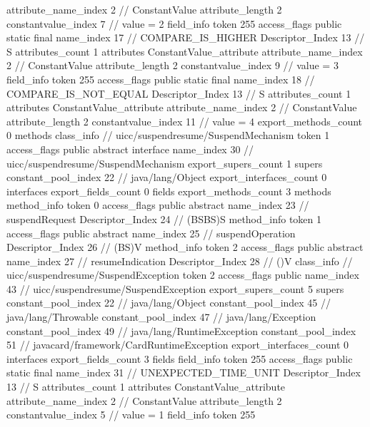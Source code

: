 {{{{{{{					attribute_name_index	2		// ConstantValue
					attribute_length	2
					constantvalue_index	7		// value = 2
				}
				}
			}
			field_info {
				token	255
				access_flags	public static final
				name_index	17		// COMPARE_IS_HIGHER
				Descriptor_Index	13		// S
				attributes_count	1
				attributes {
				ConstantValue_attribute {
					attribute_name_index	2		// ConstantValue
					attribute_length	2
					constantvalue_index	9		// value = 3
				}
				}
			}
			field_info {
				token	255
				access_flags	public static final
				name_index	18		// COMPARE_IS_NOT_EQUAL
				Descriptor_Index	13		// S
				attributes_count	1
				attributes {
				ConstantValue_attribute {
					attribute_name_index	2		// ConstantValue
					attribute_length	2
					constantvalue_index	11		// value = 4
				}
				}
			}
			}
			export_methods_count	0
			methods {
			}
		}
		class_info {		// uicc/suspendresume/SuspendMechanism
			token	1
			access_flags	public abstract interface
			name_index	30		// uicc/suspendresume/SuspendMechanism
			export_supers_count	1
			supers {
				constant_pool_index	22		// java/lang/Object
			}
			export_interfaces_count	0
			interfaces {
			}
			export_fields_count	0
			fields {
			}
			export_methods_count	3
			methods {
				method_info {
					token	0
					access_flags	public abstract
					name_index	23		// suspendRequest
					Descriptor_Index	24		// (BSBS)S
				}
				method_info {
					token	1
					access_flags	public abstract
					name_index	25		// suspendOperation
					Descriptor_Index	26		// (BS)V
				}
				method_info {
					token	2
					access_flags	public abstract
					name_index	27		// resumeIndication
					Descriptor_Index	28		// ()V
				}
			}
		}
		class_info {		// uicc/suspendresume/SuspendException
			token	2
			access_flags	public
			name_index	43		// uicc/suspendresume/SuspendException
			export_supers_count	5
			supers {
				constant_pool_index	22		// java/lang/Object
				constant_pool_index	45		// java/lang/Throwable
				constant_pool_index	47		// java/lang/Exception
				constant_pool_index	49		// java/lang/RuntimeException
				constant_pool_index	51		// javacard/framework/CardRuntimeException
			}
			export_interfaces_count	0
			interfaces {
			}
			export_fields_count	3
			fields {
			field_info {
				token	255
				access_flags	public static final
				name_index	31		// UNEXPECTED_TIME_UNIT
				Descriptor_Index	13		// S
				attributes_count	1
				attributes {
				ConstantValue_attribute {
					attribute_name_index	2		// ConstantValue
					attribute_length	2
					constantvalue_index	5		// value = 1
				}
				}
			}
			field_info {
				token	255
}}}}}
